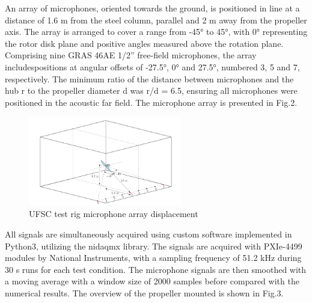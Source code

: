 \documentclass[10pt,fleqn,a4paper,twoside]{article}
\begin{document}
An array of microphones, oriented towards the ground, is positioned in line at a distance of 1.6 m from the steel column, parallel and 2 m away from the propeller axis. The array is arranged to cover a range from -45° to 45°, with 0° representing the rotor disk plane and positive angles measured above the rotation plane. Comprising nine GRAS 46AE 1/2” free-field microphones, the array includespositions at angular offsets of -27.5°, 0° and 27.5°, numbered 3, 5 and 7, respectively. The minimum ratio of the distance between microphones and the hub r to the propeller diameter d was r/d = 6.5, ensuring all microphones were positioned in the acoustic far field. The microphone array is presented in Fig.2.
\clearpage
\begin{figure}
    \centering
    \includegraphics[width=0.6\textwidth]{Figures/ufsc_microphone_array.png}
    \caption{UFSC test rig microphone array displacement}
    \label{fig2}
    \end{figure}

All signals are simultaneously acquired using custom software implemented in Python3, utilizing the nidaqmx
library. The signals are acquired with PXIe-4499 modules by National Instruments, with a sampling frequency of 51.2 kHz during 30 s runs for each test condition\citep{Augusto}. The microphone signals are then smoothed with a moving average with a window size of 2000 samples before compared with the numerical results. The overview of the propeller mounted is shown in Fig.3.
\end{document}

